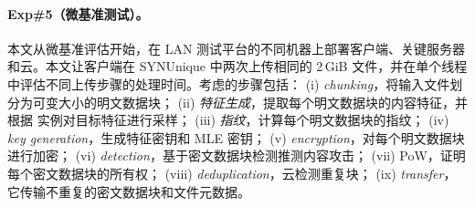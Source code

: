 \paragraph*{Exp\#5（微基准测试）。}
本文从微基准评估开始，在 LAN 测试平台的不同机器上部署客户端、关键服务器和云。本文让客户端在 SYNUnique 中两次上传相同的 2\,GiB 文件，并在单个线程中评估不同上传步骤的处理时间。考虑的步骤包括： (i) {\em chunking}，将输入文件划分为可变大小的明文数据块； (ii) {\em 特征生成}，提取每个明文数据块的内容特征，并根据 \sysnameF 实例对目标特征进行采样； (iii) {\em 指纹}，计算每个明文数据块的指纹； (iv) {\em key generation}，生成特征密钥和 MLE 密钥； (v) {\em encryption}，对每个明文数据块进行加密； (vi) {\em detection}，基于密文数据块检测推测内容攻击； (vii) {PoW}，证明每个密文数据块的所有权； (viii) {\em deduplication}，云检测重复块； (ix) {\em transfer}，它传输不重复的密文数据块和文件元数据。



